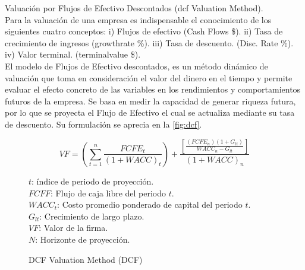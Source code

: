 \textcolor{principal}{Valuaci\'on por Flujos de Efectivo Descontados (\gls{dcf} Valuation Method).}\\[5pt]

Para la valuaci\'on de una empresa es indispensable el conocimiento de los siguientes cuatro conceptos: i) Flujos de efectivo (Cash Flows \$). ii) Tasa de crecimiento de ingresos (\gls{growthrate} \%). iii) Tasa de descuento. (Disc. Rate \%). iv) Valor terminal. (\gls{terminalvalue} \$).\\

El modelo de Flujos de Efectivo descontados, es un m\'etodo din\'amico de valuaci\'on que toma en consideraci\'on el valor del dinero en el tiempo y permite evaluar el efecto concreto de las variables en los rendimientos y comportamientos futuros de la empresa. Se basa en medir la capacidad de generar riqueza futura, por lo que se proyecta el Flujo de Efectivo el cual se actualiza mediante su tasa de descuento. Su formulaci\'on se aprecia en la \textcolor{secundario}{\autoref{fig:dcf}}.\vspace{10pt}
\begin{figure}[H]
\centering
\caption{\textcolor{principal}{DCF Valuation Method (DCF)\label{fig:dcf}}}
$$VF=\left(\sum_{t=1}^n\frac{FCFE_t}{(1+WACC)_t}\right) + \frac{\left[\frac{(FCFE_n)(1+G_{lt})}{WACC_n-G_{lt}}\right]}{(1+WACC)_n}$$
\begin{minipage}{7cm}

\footnotesize
$t$: \'indice de periodo de proyecci\'on.\\
$FCFF$: Flujo de caja libre del periodo $t$.\\
$WACC_t$: Costo promedio ponderado de capital del periodo $t$.\\
$G_{lt}$: Crecimiento de largo plazo.\\
$VF$: Valor de la firma.\\
$N$: Horizonte de proyecci\'on.\\[10pt]

\end{minipage}
\end{figure}
